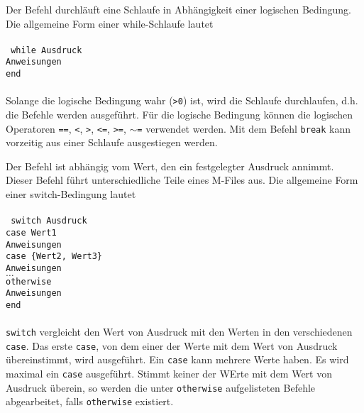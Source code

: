 

Der Befehl  durchläuft eine Schlaufe in Abhängigkeit einer logischen Bedingung. Die allgemeine Form einer while-Schlaufe lautet
\\\\
{\color{red}\texttt{
while Ausdruck\\
\indent Anweisungen\\   
end
}}
\\\\
Solange die logische Bedingung wahr ({\color{red}\texttt{>0}}) ist, wird die Schlaufe durchlaufen, d.h. die Befehle werden ausgeführt. Für die logische Bedingung können die logischen Operatoren {\color{red}\texttt{==}}, {\color{red}\texttt{<}}, {\color{red}\texttt{>}}, {\color{red}\texttt{<=}}, {\color{red}\texttt{>=}}, {\color{red}\texttt{$\sim$=}} verwendet werden. Mit dem Befehl {\color{red}\texttt{break}} kann vorzeitig aus einer Schlaufe ausgestiegen werden.

Der Befehl  ist abhängig vom Wert, den ein festgelegter Ausdruck annimmt. Dieser Befehl führt unterschiedliche Teile eines M-Files aus. Die allgemeine Form einer switch-Bedingung lautet
\\\\
{\color{red}\texttt{
switch Ausdruck\\
\indent case Wert1\\
\indent \indent Anweisungen\\
\indent case \{Wert2, Wert3\}\\
\indent \indent Anweisungen\\
\indent $\dotso$\\
\indent otherwise\\
\indent \indent Anweisungen\\
end
}}
\\\\
\texttt{switch} vergleicht den Wert von Ausdruck mit den Werten in den verschiedenen \texttt{case}. Das erste \texttt{case}, von dem einer der Werte mit dem Wert von Ausdruck übereinstimmt, wird ausgeführt. Ein \texttt{case} kann mehrere Werte haben. Es wird maximal ein \texttt{case} ausgeführt. Stimmt keiner der WErte mit dem Wert von Ausdruck überein, so werden die unter \texttt{otherwise} aufgelisteten Befehle abgearbeitet, falls \texttt{otherwise} existiert.


